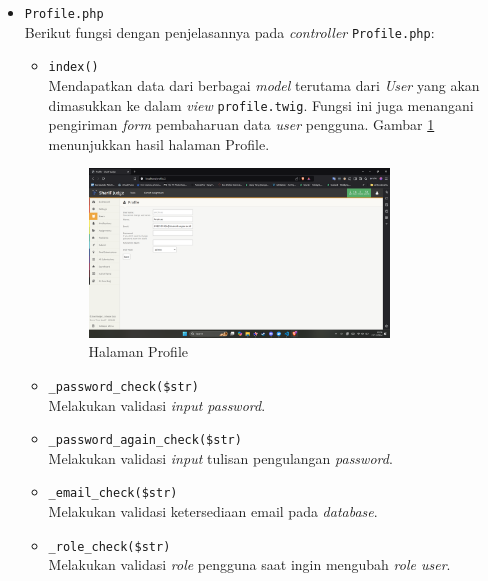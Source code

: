 \documentclass[a4paper,twoside]{article}
\begin{document}
\begin{enumerate}
\begin{itemize}
\begin{itemize}
\begin{itemize}
			                  \end{itemize}

			            \item \verb|Profile.php| \\
			                  Berikut fungsi dengan penjelasannya pada \textit{controller} \verb|Profile.php|:

			                  \begin{itemize}
				                  \item \verb|index()| \\
				                        Mendapatkan data dari berbagai \textit{model} terutama dari \textit{User} yang akan dimasukkan ke dalam \textit{view} \verb|profile.twig|. Fungsi ini juga menangani pengiriman \textit{form} pembaharuan data \textit{user} pengguna. Gambar \ref{fig:3:1:1:profile} menunjukkan hasil halaman Profile.

				                        \begin{figure}[H]
					                        \centering
					                        \includegraphics[width=0.8\textwidth]{views/profile.png}
					                        \caption{Halaman Profile}
					                        \label{fig:3:1:1:profile}
				                        \end{figure}
				                  \item \verb|_password_check($str)| \\
				                        Melakukan validasi \textit{input password}.
				                  \item \verb|_password_again_check($str)| \\
				                        Melakukan validasi \textit{input} tulisan pengulangan \textit{password}.
				                  \item \verb|_email_check($str)| \\
				                        Melakukan validasi ketersediaan email pada \textit{database}.
				                  \item \verb|_role_check($str)| \\
				                        Melakukan validasi \textit{role} pengguna saat ingin mengubah \textit{role user}.
			                  \end{itemize}


\end{itemize}
\end{itemize}
\end{enumerate}
\end{document}
